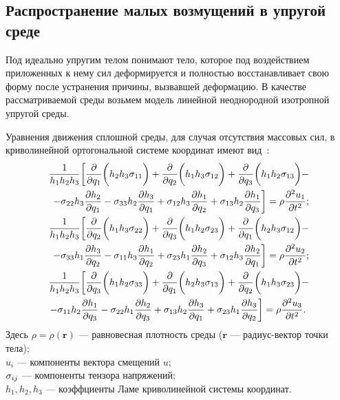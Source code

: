 \newpage
\subsection{Распространение малых возмущений в упругой среде}
Под идеально упругим телом понимают тело, которое под воздействием приложенных к нему сил деформируется и полностью восстанавливает свою форму после устранения причины, вызвавшей деформацию. В качестве рассматриваемой среды возьмем модель линейной неоднородной изотропной упругой среды.

Уравнения движения сплошной среды, для случая отсутствия массовых сил, в криволинейной ортогональной системе координат имеют вид~\cite{Nowacki}:
\begin{equation}\label{eq moving}
\begin{split}
\frac{1}{h_1h_2h_3}\biggl[\frac{\partial}{\partial q_1} \biggl(h_2h_3\sigma_{11}\biggr) + \frac{\partial}{\partial q_2} \biggl(h_1h_3\sigma_{12}\biggr) +\frac{\partial}{\partial q_3} \biggl(h_1h_2\sigma_{13}\biggr) -\\
 -\sigma_{22}h_3\frac{\partial h_2}{\partial q_1} -\sigma_{33}h_2\frac{\partial h_3}{\partial q_1} + \sigma_{12}h_3\frac{\partial h_1}{\partial q_2} + \sigma_{13}h_2\frac{\partial h_1}{\partial q_3}\biggr] = \rho \frac{\partial^2 u_1}{\partial t^2};\\
 \frac{1}{h_1h_2h_3}\biggl[\frac{\partial}{\partial q_2} \biggl(h_1h_3\sigma_{22}\biggr) + \frac{\partial}{\partial q_3} \biggl(h_1h_2\sigma_{23}\biggr) +\frac{\partial}{\partial q_1} \biggl(h_2h_3\sigma_{12}\biggr) -\\
 -\sigma_{33}h_1\frac{\partial h_3}{\partial q_2} -\sigma_{11}h_3\frac{\partial h_1}{\partial q_2} + \sigma_{23}h_1\frac{\partial h_2}{\partial q_3} + \sigma_{12}h_3\frac{\partial h_2}{\partial q_1}\biggr] = \rho \frac{\partial^2 u_2}{\partial t^2};\\
 \frac{1}{h_1h_2h_3}\biggl[\frac{\partial}{\partial q_3} \biggl(h_1h_2\sigma_{33}\biggr) + \frac{\partial}{\partial q_1} \biggl(h_2h_3\sigma_{13}\biggr) +\frac{\partial}{\partial q_2} \biggl(h_1h_3\sigma_{23}\biggr) -\\
 -\sigma_{11}h_2\frac{\partial h_1}{\partial q_3} -\sigma_{22}h_1\frac{\partial h_2}{\partial q_3} + \sigma_{13}h_2\frac{\partial h_3}{\partial q_1} + \sigma_{23}h_1\frac{\partial h_3}{\partial q_2}\biggr] = \rho \frac{\partial^2 u_3}{\partial t^2}.\
\end{split}
\end{equation}
Здесь $\rho = \rho(\textbf{r})$ --- равновесная плотность среды ($\textbf{r}$ --- радиус-вектор точки тела);\\
$u_i$ --- компоненты вектора смещений $u;$\\
$\sigma_{ij}$ --- компоненты тензора напряжений;\\
$h_1,h_2,h_3$ --- коэффциенты Ламе криволинейной системы координат.

